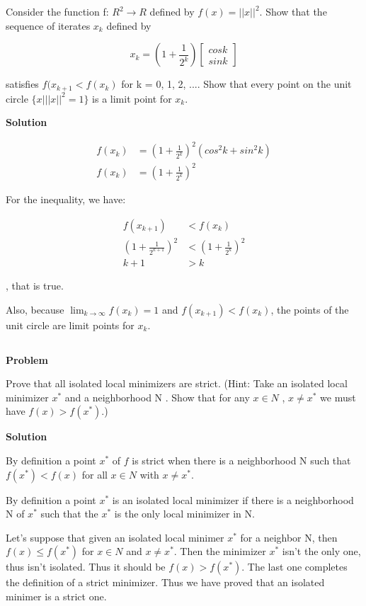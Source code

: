 \documentclass[a4paper,11pt]{article}
\numberwithin{equation}{section} %
\begin{document}
Consider the function f: $R^2 \rightarrow R$ defined by $f(x) = {||x||}^2$. Show that the sequence of iterates {$x_k$} defined by

\[x_k = (1 + \frac{1}{2^k}) \begin{bmatrix}
    cosk \\ sink
\end{bmatrix}\]

satisfies $f(x_{k+1} < f(x_k)$ for k = 0, 1, 2, .... Show that every point on the unit circle $\{x | {||x||}^2 = 1\}$ is a limit point for {$x_k$}.

\textbf{Solution}

\begin{align}
    f(x_k) &= (1+\frac{1}{2^k})^2(cos^2k + sin^2k) \\
    f(x_k) &= (1+\frac{1}{2^k})^2
\end{align}

For the inequality, we have:

\begin{align}
    f(x_{k+1}) &< f(x_k) \\
    (1 + \frac{1}{2^{k+1}})^2 &< (1 + \frac{1}{2^k})^2 \\ 
    k+1 &> k
\end{align}

, that is true.

Also, because $\lim_{k\to\infty} f(x_k) = 1$ and $f(x_{k+1}) < f(x_k)$, the points of the unit circle are limit points for {$x_k$}.

\subsection{}

\textbf{Problem}

Prove that all isolated local minimizers are strict. (Hint: Take an isolated local
minimizer $x^{*}$ and a neighborhood N . Show that for any $x \in N$ , $x \neq x^{*}$ we must have $f(x) > f(x^{*})$.)

\textbf{Solution}

By definition a point $x^{*}$ of $f$ is strict when there is a neighborhood N such that $f(x^{*}) < f(x)$ for all $x \in N$ with $x \neq x^{*}$.

By definition a point $x^{*}$ is an isolated local minimizer if there is a neighborhood N of $x^{*}$ such that the $x^{*}$ is the only local minimizer in N.

Let's suppose that given an isolated local minimer $x^{*}$ for a neighbor N, then $f(x) \leq f(x^{*})$ for $x \in N$ and $x \neq x^{*}$. Then the minimizer $x^{*}$ isn't the only one, thus isn't isolated. Thus it should be $f(x) > f(x^{*})$. The last one completes the definition of a strict minimizer. Thus we have proved that an isolated minimer is a strict one.
\end{document}

